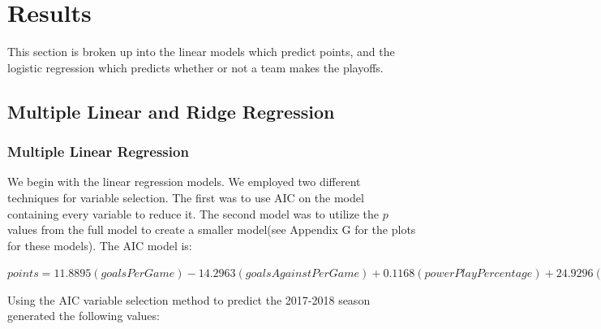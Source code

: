 \chapter{Results}
This section is broken up into the linear models which predict points, and the logistic regression which predicts whether or not a team makes the playoffs.
\section*{Multiple Linear and Ridge Regression}
\subsection*{Multiple Linear Regression}
We begin with the linear regression models. We employed two different techniques for variable selection. The first was to use AIC on the model containing every variable to reduce it. The second model was to utilize the $p$ values from the full model to create a smaller model(see Appendix G for the plots for these models). The AIC model is: \begin{center}$
	points = 11.8895(goalsPerGame) - 14.2963(goalsAgainstPerGame) + 0.1168(powerPlayPercentage) + 24.9296(winScoreFirst) + 26.3916(winOppScoreFirst) - 10.1651(winLeadSecondPer) + 24.6731(winOutshootOpp) + 23.2772(winOutshotByOpp) + 0.1465(faceOffWinPercentage) + 48.08239  
	$\end{center}
Using the AIC variable selection method to predict the 2017-2018 season generated the following values: 
